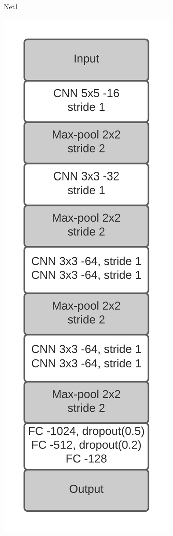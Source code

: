 \documentclass{article}
\begin{document}
\begin{figure}[h!]
\begin{subfigure}[t]{.23\textwidth}
	  \caption{Net1}
	\end{subfigure}
	\begin{subfigure}[t]{.23\textwidth}
	  \centering
	  \includegraphics[scale=0.66]{../code/images/Net2_layers.png}  

\end{subfigure}
\end{figure}
\end{document}
